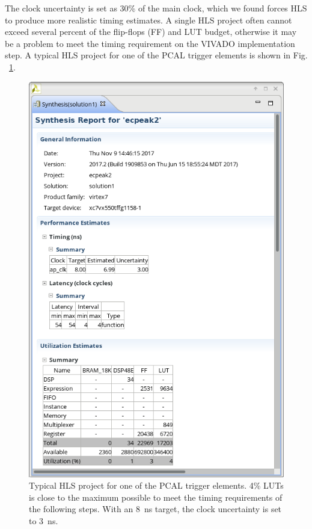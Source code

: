 The clock uncertainty is set as 30\% of the main clock, which we found forces HLS to produce more realistic timing estimates. A single HLS project often cannot exceed several percent of the flip-flops (FF) and LUT budget, otherwise it may be a problem to meet the timing requirement on the VIVADO implementation step. A typical HLS project for one of the PCAL trigger elements is shown in Fig. ~\ref{fig:hls}.

\begin{figure}[hbt]
	\centering
	\includegraphics[width=1.0\columnwidth,keepaspectratio]{img/hls.png}
	\caption{Typical HLS project for one of the PCAL trigger elements. 4\% LUTs is close to the maximum possible to meet the timing requirements of the following steps. With an 8~ns target, the clock uncertainty  is set to 3~ns.}
	\label{fig:hls}
\end{figure}

